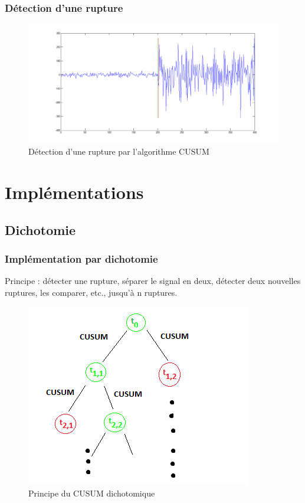 \documentclass{beamer}
\begin{document}
\begin{frame}
	\frametitle{Détection d'une rupture}
	\begin{figure}
		\includegraphics[scale=0.3]{cusum_1rupt.png}
		\caption{Détection d'une rupture par l'algorithme CUSUM}
	\end{figure}
\end{frame}

\section{Implémentations}

\subsection{Dichotomie}

\begin{frame}

\frametitle{Implémentation par dichotomie}

Principe : détecter une rupture, séparer le signal en deux, détecter deux nouvelles ruptures, les comparer, etc., jusqu'à n ruptures.
\begin{figure}
	\includegraphics[scale=0.5]{diagramme_cusum_dikt.png}
	\caption{Principe du CUSUM dichotomique}
\end{figure}



\end{frame}
\end{document}
